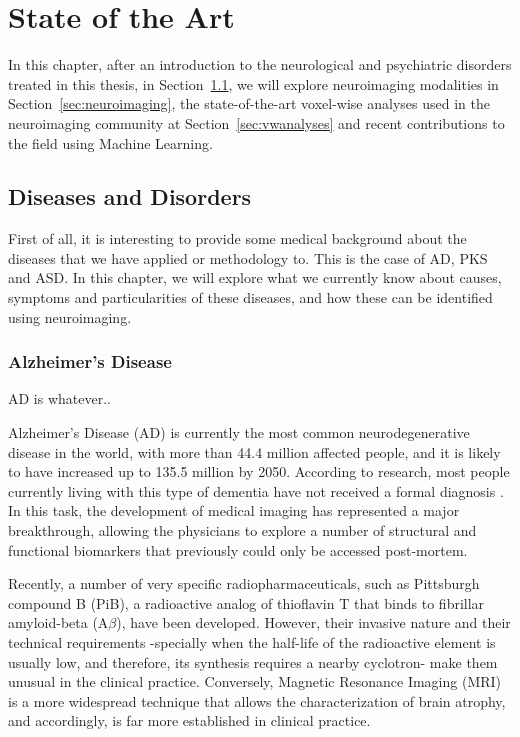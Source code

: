 \chapter{State of the Art}\label{ch:medicine}
In this chapter, after an introduction to the neurological and psychiatric disorders treated in this thesis, in Section~\ref{sec:disorders}, we will explore neuroimaging modalities in Section~\ref{sec:neuroimaging}, the state-of-the-art voxel-wise analyses used in the neuroimaging community at Section~\ref{sec:vwanalyses} and recent contributions to the field using Machine Learning. 

\section{Diseases and Disorders}\label{sec:disorders}
First of all, it is interesting to provide some medical background about the diseases that we have applied or methodology to. This is the case of \ac{AD}, \ac{PKS} and \ac{ASD}. In this chapter, we will explore what we currently know about causes, symptoms and particularities of these diseases, and how these can be identified using neuroimaging. 


\subsection{Alzheimer's Disease}
\ac{AD} is whatever.. 

Alzheimer's Disease (AD) is currently the most common neurodegenerative disease in the world, with more than 44.4 million affected people, and it is likely to have increased up to 135.5 million by 2050. According to research, most people currently living with this type of dementia have not received a formal diagnosis \cite{ADInforme2013}. In this task, the development of medical imaging has represented a major breakthrough, allowing the physicians to explore a number of structural and functional biomarkers that previously could only be accessed post-mortem. 

Recently, a number of very specific radiopharmaceuticals, such as Pittsburgh compound B (PiB), a radioactive analog of thioflavin T that  binds to fibrillar amyloid-beta (A$\beta$), have been developed. However,  their invasive nature and their technical requirements -specially when the half-life of the radioactive element is usually low, and therefore, its synthesis requires a nearby cyclotron- make them unusual in the clinical practice. Conversely, Magnetic Resonance Imaging (MRI) is a more widespread technique that allows the characterization of brain atrophy, and accordingly, is far more established in clinical practice. 


